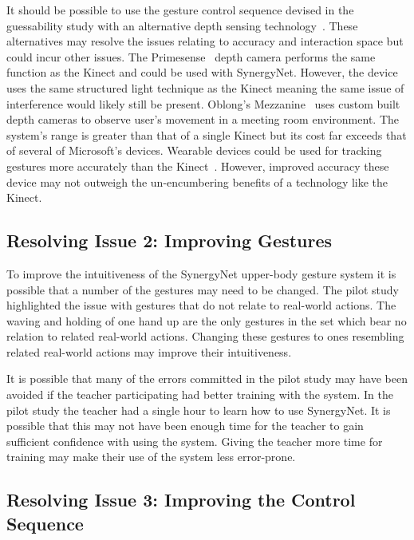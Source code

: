 \documentclass[link]{IWCOMP}
\begin{document}
It should be possible to use the gesture control sequence devised in the guessability study with an alternative depth sensing technology~\cite{Kean2011}.
These alternatives may resolve the issues relating to accuracy and interaction space but could incur other issues.
The Primesense~\cite{Wilson2010} depth camera performs the same function as the Kinect and could be used with SynergyNet.
However, the device uses the same structured light technique as the Kinect meaning the same issue of interference would likely still be present.
Oblong's Mezzanine~\cite{kramer2011} uses custom built depth cameras to observe user's movement in a meeting room environment.
The system's range is greater than that of a single Kinect but its cost far exceeds that of several of Microsoft's devices.
Wearable devices could be used for tracking gestures more accurately than the Kinect~\cite{Rekimotoa,Zhu2011}.
However, improved accuracy these device may not outweigh the un-encumbering benefits of a technology like the Kinect.

\subsection{Resolving Issue 2: Improving Gestures}
\label{subsec:resolvingIssuesObserved2}

To improve the intuitiveness of the SynergyNet upper-body gesture system it is possible that a number of the gestures may need to be changed.
The pilot study highlighted the issue with gestures that do not relate to real-world actions. 
The waving and holding of one hand up are the only gestures in the set which bear no relation to related real-world actions.
Changing these gestures to ones resembling related real-world actions may improve their intuitiveness.

It is possible that many of the errors committed in the pilot study may have been avoided if the teacher participating had better training with the system.
In the pilot study the teacher had a single hour to learn how to use SynergyNet.
It is possible that this may not have been enough time for the teacher to gain sufficient confidence with using the system.
Giving the teacher more time for training may make their use of the system less error-prone.

\subsection{Resolving Issue 3: Improving the Control Sequence}
\label{subsec:resolvingIssuesObserved3}
\end{document}
